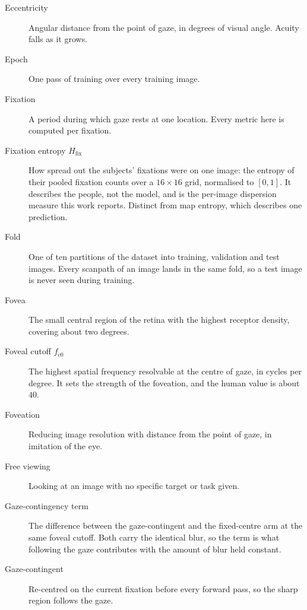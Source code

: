 \begin{description}
\item[Eccentricity] Angular distance from the point of gaze, in degrees of visual angle. Acuity falls as
  it grows.

\item[Epoch] One pass of training over every training image.

\item[Fixation] A period during which gaze rests at one location. Every metric here is computed per
  fixation.

\item[Fixation entropy $H_{\text{fix}}$] How spread out the subjects' fixations were on one
  image: the entropy of their pooled fixation counts over a $16 \times 16$ grid, normalised to
  $[0, 1]$. It describes the people, not the model, and is the per-image dispersion measure this
  work reports. Distinct from map entropy, which describes one prediction.

\item[Fold] One of ten partitions of the dataset into training, validation and test images. Every
  scanpath of an image lands in the same fold, so a test image is never seen during training.

\item[Fovea] The small central region of the retina with the highest receptor density, covering about
  two degrees.

\item[Foveal cutoff $f_{c0}$] The highest spatial frequency resolvable at the centre of gaze, in cycles
  per degree. It sets the strength of the foveation, and the human value is about $40$.

\item[Foveation] Reducing image resolution with distance from the point of gaze, in imitation of the
  eye.

\item[Free viewing] Looking at an image with no specific target or task given.

\item[Gaze-contingency term] The difference between the gaze-contingent and the fixed-centre arm at the
  same foveal cutoff. Both carry the identical blur, so the term is what following the gaze contributes
  with the amount of blur held constant.

\item[Gaze-contingent] Re-centred on the current fixation before every forward pass, so the sharp region
  follows the gaze.


\end{description}

